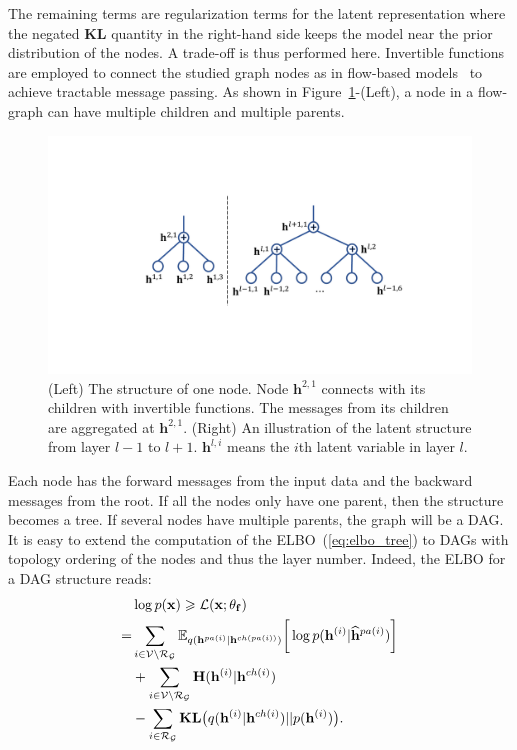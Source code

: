 \documentclass[twoside]{article}
\begin{document}
The remaining terms are regularization terms for the latent representation where the negated \textbf{KL} quantity in the right-hand side keeps the model near the prior distribution of the nodes. 
A trade-off is thus performed here.
Invertible functions are employed to connect the studied graph nodes as in flow-based models~\cite{Dinh2016DensityEU} to achieve tractable message passing. 
As shown in Figure~\ref{fig:node_tree}-(Left), a node in a flow-graph can have multiple children and multiple parents.
\begin{figure}[H]
\begin{center}
 \includegraphics[width=1.0\linewidth]{fig/node.pdf}
\end{center}
\vspace{-0.2in}
\caption{ {\small (Left) The structure of one node. Node $\mathbf{h}^{2, 1}$ connects with its children with invertible functions. The messages from its children are aggregated at $\mathbf{h}^{2,1}$. (Right) An illustration of the latent structure from layer $l-1$ to $l+1$.  
$\mathbf{h}^{l, i}$ means the $i$th latent variable  in layer $l$.}}
\label{fig:node_tree}
\vspace{-0.15in}
\end{figure}
Each node has the forward messages from the input data and the backward messages from the root.  
If all the nodes only have one parent, then the structure becomes a tree. 
If several nodes have multiple parents, the graph will be a DAG. 
It is easy to extend the computation of the ELBO~(\ref{eq:elbo_tree}) to DAGs with topology ordering of the nodes and thus the layer number. 
Indeed, the ELBO for a DAG structure reads:
\begin{align}  \notag
& \log p(\mathbf{x})  \geqslant \mathcal{L}(\mathbf{x}; \theta_{\mathbf{f}}) \\  \label{eq:elbo_dag}
= &  \sum_{i \in \mathcal{V}  \setminus  \mathcal{R}_{ \mathcal{G} }  }  \mathbb{E}_{q(\mathbf{h}^{pa(i)}|\mathbf{h}^{ch(pa(i))})} \bigg[ \log p( \mathbf{h}^{(i)}|  \widehat{\mathbf{h}}^{pa(i)})   \bigg]\\ \notag
 & +  \sum_{i \in \mathcal{V}  \setminus  \mathcal{R}_{ \mathcal{G} }  } \textbf{\text{H}}(\mathbf{h}^{(i)} | \mathbf{h}^{ch(i)} )  \\ \notag
 &  -    \sum_{i \in  \mathcal{R}_{ \mathcal{G} }  }  \textbf{\text{KL}}\big(q(\mathbf{h}^{(i)} | \mathbf{h}^{ch(i)} )   || p(\mathbf{h}^{(i)})  \big) .
 \end{align}
\end{document}
